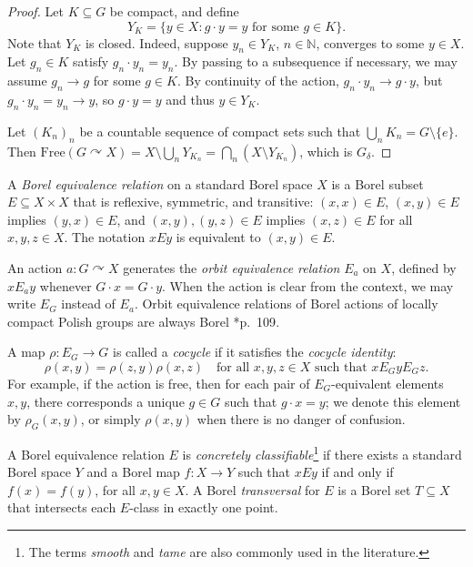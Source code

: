 \documentclass[12pt]{paper}
\numberwithin{equation}{section}
\theoremstyle{plain}
\theoremstyle{definition}
\newcommand{\N}{\mathbb{N}}
\newcommand{\acts}{\curvearrowright}
\newcommand{\free}{\mathrm{Free}}
\begin{document}
\begin{proof}
Let \(K \subseteq G\) be compact, and define
\[
  Y_{K} = \{y \in X : g\cdot y = y \textrm{ for some } g \in K\}.
\]
Note that \(Y_{K}\) is closed. Indeed, suppose \(y_{n} \in Y_{K}\), \(n \in \N\), converges to
some \(y \in X\).  Let \(g_{n}\in K\) satisfy \(g_{n}\cdot y_{n} = y_{n}\).  By passing to a
subsequence if necessary, we may assume \(g_{n} \to g\) for some \(g \in K\).  By continuity of
the action, \(g_{n}\cdot y_{n} \to g\cdot y\), but \(g_{n}\cdot y_{n} = y_{n} \to y\), so
\(g\cdot y = y\) and thus \(y \in Y_{K}\).

Let \((K_{n})_{n}\) be a countable sequence of compact sets such that
\(\bigcup_{n} K_{n} = G \setminus \{e\}\).  Then
\(\free(G \acts X) = X \setminus \bigcup_{n} Y_{K_{n}} = \bigcap_{n} (X\setminus Y_{K_{n}})\),
which is \(G_{\delta}\).
\end{proof}

A \emph{Borel equivalence relation} on a standard Borel space \(X\) is a Borel subset
\(E \subseteq X \times X\) that is reflexive, symmetric, and transitive: \((x,x) \in E\),
\((x,y) \in E\) implies \((y,x) \in E\), and \((x,y), (y,z) \in E \) implies \((x,z) \in E\) for all
\(x, y, z \in X\). The notation \(x E y\) is equivalent to \((x,y) \in E\).

An action \(a : G \acts X\) generates the \emph{orbit equivalence relation} \(E_{a}\) on \(X\),
defined by \(x E_{a} y\) whenever \(G \cdot x = G \cdot y\).  When the action is clear from the
context, we may write \(E_{G}\) instead of \(E_{a}\).  Orbit equivalence relations of Borel actions
of locally compact Polish groups are always Borel \cite{beckerDescriptiveSetTheory1996}*{p.~109}.

A map \(\rho : E_{G} \to G\) is called a \emph{cocycle} if it satisfies the \emph{cocycle identity}:
\[\rho(x,y) = \rho(z,y) \rho(x,z) \quad \textrm{for all } x,y,z \in X \textrm{ such that } x
  E_{G} y E_{G} z.\]
For example, if the action is free, then for each pair of \(E_{G}\)-equivalent elements \(x,y\),
there corresponds a unique \(g \in G\) such that \(g \cdot x = y\); we denote this element by
\(\rho_{G}(x,y)\), or simply \(\rho(x,y)\) when there is no danger of confusion.

A Borel equivalence relation \(E\) is \emph{concretely classifiable}\footnote{The terms
  \emph{smooth} and \emph{tame} are also commonly used in the literature.} if there exists a
standard Borel space \(Y\) and a Borel map \(f : X \to Y\) such that \(x E y\) if and only if
\(f(x) = f(y)\), for all \(x, y \in X\).  A Borel \emph{transversal} for \(E\) is a Borel set
\(T \subseteq X\) that intersects each \(E\)-class in exactly one point.
\end{document}
